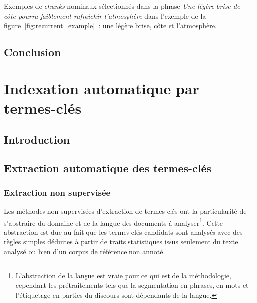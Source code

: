         Exemples de \textit{chunks} nominaux sélectionnés dans la phrase
        \textit{\og{}Une légère brise de côte pourra faiblement rafraichir
        l'atmosphère\fg{}} dans l'exemple de la
        figure~\ref{fig:recurrent_example}~: \og{}une légère brise\fg{},
        \og{}côte\fg{} et \og{}l'atmosphère\fg{}.

    \section{Conclusion}
    \label{sec:main-state_of_the_art-keyphrase_candidate_selection-conclusion}


  \chapter{Indexation automatique par termes-clés}
  \label{chap:main-state_of_the_art-automatic_keyphrase_extraction}
    \section{Introduction}
    \label{sec:main-state_of_the_art-automatic_keyphrase_extraction-introduction}

    \section{Extraction automatique des termes-clés }
    \label{sec:main-state_of_the_art-automatic_keyphrase_extraction-automatic_keyphrase_extraction}
      \subsection{Extraction non supervisée}
      \label{subsec:main-state_of_the_art-automatic_keyphrase_extraction-automatic_keyphrase_extraction-unsupervised_keyphrase_extraction}
        Les méthodes non-supervisées d'extraction de termes-clés ont la
        particularité de s'abstraire du domaine et de la langue des documents à
        analyser\footnote{L'abstraction de la langue est vraie pour ce qui est
        de la méthodologie, cependant les prétraitements tels que la
        segmentation en phrases, en mots et l'étiquetage en parties du discours
        sont dépendants de la langue.}. Cette abstraction est due au fait que
        les termes-clés candidats sont analysés avec des règles simples déduites
        à partir de traits statistiques issus seulement du texte analysé ou bien
        d'un corpus de référence non annoté.

